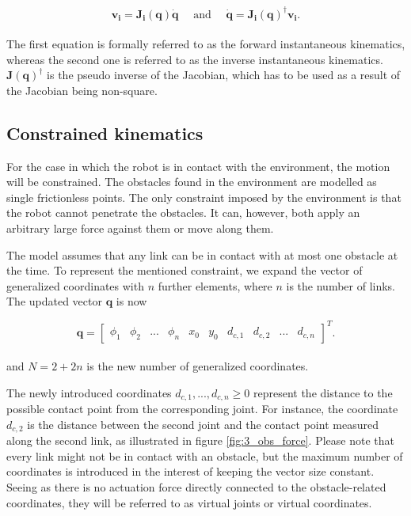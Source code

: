 \begin{equation}
    \mathbf{v_i = J_i(q) \dot{q}} \quad \textrm{ and } \quad \mathbf{\dot{q} = J_i(q)^\dagger v_i}.
\end{equation}
\\
The first equation is formally referred to as the forward instantaneous kinematics, whereas the second one is referred to as the inverse instantaneous kinematics.
$\mathbf{J(q)^\dagger}$ is the pseudo inverse of the Jacobian, which has to be used as a result of the Jacobian being non-square.


\subsection{Constrained kinematics}\label{seq:constr_kin}

For the case in which the robot is in contact with the environment, the motion will be constrained. The obstacles found in the environment are modelled as single frictionless points. The only constraint imposed by the environment is that the robot cannot penetrate the obstacles. It can, however, both apply an arbitrary large force against them or move along them.

The model assumes that any link can be in contact with at most one obstacle at the time. To represent the mentioned constraint, we expand the vector of generalized coordinates with $n$ further elements, where $n$ is the number of links. The updated vector $\mathbf{q}$ is now

\begin{equation} \label{eq:q2}
    \mathbf{q} = 
    \begin{bmatrix}
        \phi_1 & \phi_2 & ... & \phi_n & x_0 & y_0 & d_{c,1} & d_{c,2} & ... & d_{c,n}
    \end{bmatrix}^T.
\end{equation}
\\
and $N = 2 + 2n$ is the new number of generalized coordinates.

The newly introduced coordinates $d_{c,1}, ... , d_{c,n} \geq 0$ represent the distance to the possible contact point from the corresponding joint. For instance, the coordinate $d_{c,2}$ is the distance between the second joint and the contact point measured along the second link, as illustrated in figure \ref{fig:3_obs_force}. Please note that every link might not be in contact with an obstacle, but the maximum number of coordinates is introduced in the interest of keeping the vector size constant. 
Seeing as there is no actuation force directly connected to the obstacle-related coordinates, they will be referred to as virtual joints or virtual coordinates.

